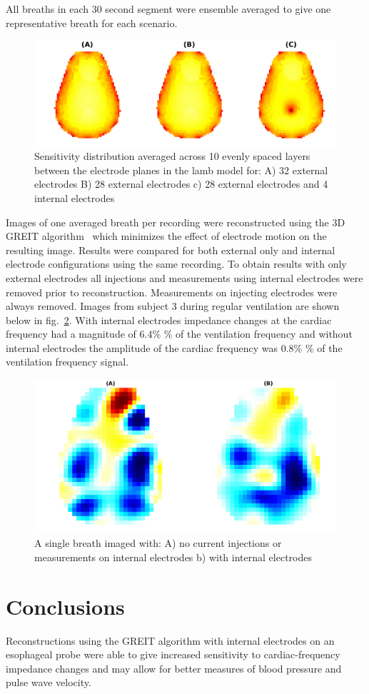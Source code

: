 All breaths in each 30 second segment were 
ensemble averaged to 
give one representative breath for each scenario.
\begin{figure}[H]
\centering
\includegraphics[width=.96\columnwidth]{chapter_5/imgs/lamb_sensitivity_profiles.pdf}
\caption[Sensitivity distribution in a lamb model]{\label{fig:sens_example}%
Sensitivity distribution averaged across 10 evenly spaced layers
between the electrode planes in the lamb model for: 
A) 32 external electrodes 
B) 28 external electrodes 
c) 28 external electrodes and 4 internal electrodes
}
\label{fig:sens_example}
\end{figure}

Images of one averaged breath per recording
were reconstructed using the 3D GREIT 
algorithm~\cite{bartek2016} which minimizes the effect
of electrode motion on the resulting image.
Results were compared for both 
external only and internal electrode configurations
using the same recording.
To obtain results with only external electrodes  all 
injections and measurements using internal electrodes 
were removed prior to reconstruction. 
Measurements on injecting electrodes were always removed.
Images from subject 3 during regular ventilation are 
shown  below in fig.~\ref{fig:img_example}.
With internal electrodes impedance changes at the cardiac frequency had a magnitude of 6.4\% \%
of the ventilation frequency and without internal electrodes the amplitude of the cardiac frequency
was 0.8\% \% of the ventilation frequency signal.
\begin{figure}[H]
\centering
\includegraphics[width=.96\columnwidth]{chapter_5/imgs/lamb_imgs.pdf}
\caption[Reconstructed image of a single breath]{\label{fig:img_example}%
A single breath imaged with:
A) no current injections or measurements on internal
electrodes 
b) with internal electrodes
}
\label{fig:img_example}
\end{figure}
\section{Conclusions}
Reconstructions using the GREIT algorithm
with internal electrodes on 
an esophageal probe were able to give increased
sensitivity to cardiac-frequency impedance changes 
and may allow for better measures of blood pressure and pulse
wave velocity.   



